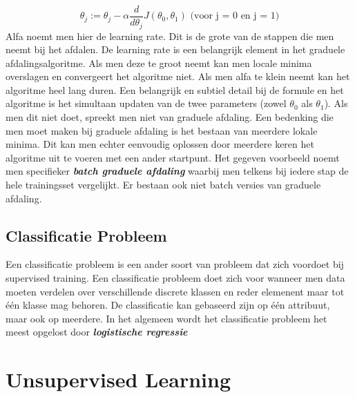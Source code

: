 \[ \theta_{j} := \theta_{j} - \alpha\frac{d}{d\theta_{j}}J(\theta_{0},\theta_{1})   \text{  (voor j = 0 en j = 1)}\] 
Alfa noemt men hier de learning rate. Dit is de grote van de stappen die men neemt bij het afdalen. De learning rate is een belangrijk element in het graduele afdalingsalgoritme. Als men deze te groot neemt kan men locale minima overslagen en convergeert het algoritme niet. Als men alfa te klein neemt kan het algoritme heel lang duren. 
\newline
Een belangrijk en subtiel detail bij de formule en het algoritme is het simultaan updaten van de twee parameters (zowel $\theta_{0}$ als $\theta_{1}$). Als men dit niet doet, spreekt men niet van graduele afdaling.
\newline
Een bedenking die men moet maken bij graduele afdaling is het bestaan van meerdere lokale minima. Dit kan men echter eenvoudig oplossen door meerdere keren het algoritme uit te voeren met een ander startpunt.
\newline
Het gegeven voorbeeld noemt men specifieker \textbf{\textit{batch graduele afdaling}} waarbij men telkens bij iedere stap de hele trainingsset vergelijkt. Er bestaan ook niet batch versies van graduele afdaling.

\subsection{Classificatie Probleem}\label{Classificatie Probleem}

Een classificatie probleem is een ander soort van probleem dat zich voordoet bij supervised training. Een classificatie probleem doet zich voor wanneer men data moeten verdelen over verschillende discrete klassen en reder elemenent maar tot \'e\'en klasse mag behoren. De classificatie kan gebaseerd zijn op \'e\'en attribuut, maar ook op meerdere.
\newline
In het algemeen wordt het classificatie probleem het meest opgelost door \textbf{\textit{logistische regressie}}    

\section{Unsupervised Learning}\label{Unsupervised Learning}

